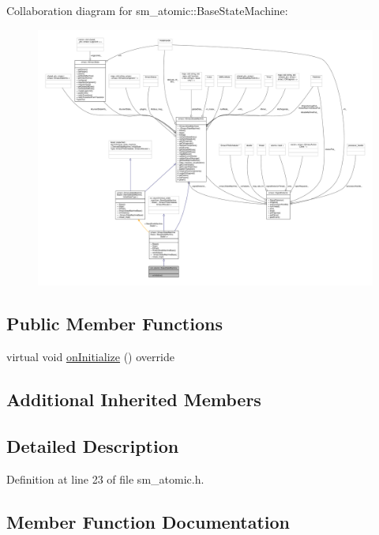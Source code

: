Collaboration diagram for sm\+\_\+atomic\+:\+:Base\+State\+Machine\+:
\nopagebreak
\begin{figure}[H]
\begin{center}
\leavevmode
\includegraphics[width=350pt]{structsm__atomic_1_1BaseStateMachine__coll__graph}
\end{center}
\end{figure}
\subsection*{Public Member Functions}
\begin{DoxyCompactItemize}
\item 
virtual void \hyperlink{structsm__atomic_1_1BaseStateMachine_ae25e8b894d86c3cf92dad935d2e9b100}{on\+Initialize} () override
\end{DoxyCompactItemize}
\subsection*{Additional Inherited Members}


\subsection{Detailed Description}


Definition at line 23 of file sm\+\_\+atomic.\+h.



\subsection{Member Function Documentation}
